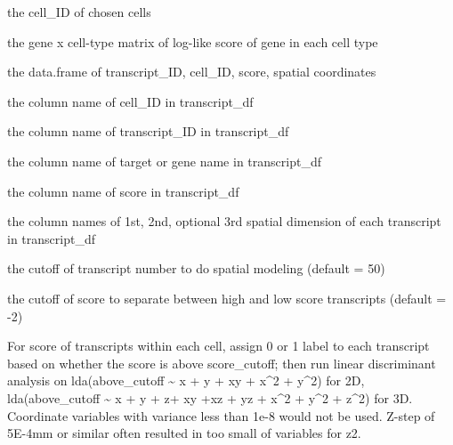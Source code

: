 \documentclass[letterpaper]{book}
\begin{document}
\begin{Arguments}
\begin{ldescription}
\item[\code{chosen\_cells}] the cell\_ID of chosen cells

\item[\code{score\_GeneMatrix}] the gene x cell-type matrix of log-like score of gene in each cell type

\item[\code{transcript\_df}] the data.frame of transcript\_ID, cell\_ID, score, spatial coordinates

\item[\code{cellID\_coln}] the column name of cell\_ID in transcript\_df

\item[\code{transID\_coln}] the column name of transcript\_ID in transcript\_df

\item[\code{transGene\_coln}] the column name of target or gene name in transcript\_df

\item[\code{score\_coln}] the column name of score in transcript\_df

\item[\code{spatLocs\_colns}] the column names of 1st, 2nd, optional 3rd spatial dimension of each transcript in transcript\_df

\item[\code{model\_cutoff}] the cutoff of transcript number to do spatial modeling (default = 50)

\item[\code{score\_cutoff}] the cutoff of score to separate between high and low score transcripts (default = -2)
\end{ldescription}
\end{Arguments}
%
\begin{Details}
For score of transcripts within each cell, assign 0 or 1 label to each transcript based on whether the score is above score\_cutoff; then run linear discriminant analysis on lda(above\_cutoff \textasciitilde{} x + y + xy + x\textasciicircum{}2 + y\textasciicircum{}2) for 2D, lda(above\_cutoff \textasciitilde{} x + y + z+ xy +xz + yz + x\textasciicircum{}2 + y\textasciicircum{}2 + z\textasciicircum{}2) for 3D. Coordinate variables with variance less than 1e-8 would not be used. Z-step of 5E-4mm or similar often resulted in too small of variables for z2.
\end{Details}
%
\end{document}
